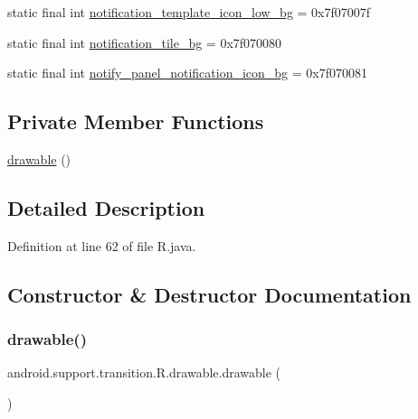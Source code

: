 \begin{DoxyCompactItemize}
\item 
static final int \mbox{\hyperlink{classandroid_1_1support_1_1transition_1_1_r_1_1drawable_abdcffad9445d9236028d811f06e030f4}{notification\+\_\+template\+\_\+icon\+\_\+low\+\_\+bg}} = 0x7f07007f
\item 
static final int \mbox{\hyperlink{classandroid_1_1support_1_1transition_1_1_r_1_1drawable_ad920be4f2a571fceddc972f834706a4d}{notification\+\_\+tile\+\_\+bg}} = 0x7f070080
\item 
static final int \mbox{\hyperlink{classandroid_1_1support_1_1transition_1_1_r_1_1drawable_a092035eb15baba9b662d4715dcf6e2f4}{notify\+\_\+panel\+\_\+notification\+\_\+icon\+\_\+bg}} = 0x7f070081
\end{DoxyCompactItemize}
\subsection*{Private Member Functions}
\begin{DoxyCompactItemize}
\item 
\mbox{\hyperlink{classandroid_1_1support_1_1transition_1_1_r_1_1drawable_a1658051e9ec2598c21b98c43166f9f4e}{drawable}} ()
\end{DoxyCompactItemize}


\subsection{Detailed Description}


Definition at line 62 of file R.\+java.



\subsection{Constructor \& Destructor Documentation}
\mbox{\label{classandroid_1_1support_1_1transition_1_1_r_1_1drawable_a1658051e9ec2598c21b98c43166f9f4e}} 
\subsubsection{\texorpdfstring{drawable()}{drawable()}}
{\footnotesize\ttfamily android.\+support.\+transition.\+R.\+drawable.\+drawable (\begin{DoxyParamCaption}{ }\end{DoxyParamCaption})\hspace{0.3cm}{\ttfamily [private]}}



